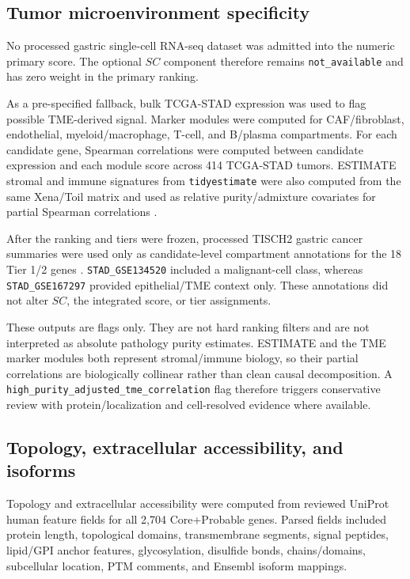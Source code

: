 \documentclass[review,12pt,authoryear]{elsarticle}
\begin{document}
\subsection{Tumor microenvironment specificity}

No processed gastric single-cell RNA-seq dataset was admitted into the numeric primary score. The optional $SC$ component therefore remains \texttt{not\_\allowbreak{}available} and has zero weight in the primary ranking.

As a pre-specified fallback, bulk TCGA-STAD expression was used to flag possible TME-derived signal. Marker modules were computed for CAF/\allowbreak{}fibroblast, endothelial, myeloid/\allowbreak{}macrophage, T-cell, and B/\allowbreak{}plasma compartments. For each candidate gene, Spearman correlations were computed between candidate expression and each module score across 414 TCGA-STAD tumors. ESTIMATE stromal and immune signatures from \texttt{tidyestimate} were also computed from the same Xena/\allowbreak{}Toil matrix and used as relative purity/\allowbreak{}admixture covariates for partial Spearman correlations \citep{yoshihara2013estimate}.

After the ranking and tiers were frozen, processed TISCH2 gastric cancer summaries were used only as candidate-level compartment annotations for the 18 Tier 1/\allowbreak{}2 genes \citep{han2023tisch2,zhang2019gastric_scrna,jeong2021gastric_tme}. \texttt{STAD\_\allowbreak{}GSE134520} included a malignant-cell class, whereas \texttt{STAD\_\allowbreak{}GSE167297} provided epithelial/\allowbreak{}TME context only. These annotations did not alter $SC$, the integrated score, or tier assignments.

These outputs are flags only. They are not hard ranking filters and are not interpreted as absolute pathology purity estimates. ESTIMATE and the TME marker modules both represent stromal/\allowbreak{}immune biology, so their partial correlations are biologically collinear rather than clean causal decomposition. A \texttt{high\_\allowbreak{}purity\_\allowbreak{}adjusted\_\allowbreak{}tme\_\allowbreak{}correlation} flag therefore triggers conservative review with protein/\allowbreak{}localization and cell-resolved evidence where available.

\subsection{Topology, extracellular accessibility, and isoforms}

Topology and extracellular accessibility were computed from reviewed UniProt human feature fields for all 2,704 Core+\allowbreak{}Probable genes. Parsed fields included protein length, topological domains, transmembrane segments, signal peptides, lipid/\allowbreak{}GPI anchor features, glycosylation, disulfide bonds, chains/\allowbreak{}domains, subcellular location, PTM comments, and Ensembl isoform mappings.
\end{document}
